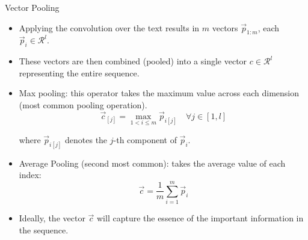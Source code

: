 \documentclass[handout]{beamer}
\begin{document}
\begin{frame}{Vector Pooling}
\begin{scriptsize}
\begin{itemize}
\item Applying the convolution over the text results in $m$ vectors $\vec{p}_{1:m}$, each $\vec{p}_i \in \mathcal{R}^l$.
\item These vectors are then combined (pooled) into a single vector $c \in \mathcal{R}^l$ representing the entire sequence.
\item Max pooling: this operator takes the maximum value across each dimension (most common pooling operation).
\begin{displaymath}
\vec{c}_{[j]}= \max_{1< i \leq m} \vec{p}_{i[j]} \quad \forall j \in [1,l]
\end{displaymath}

where $\vec{p}_{i[j]}$ denotes the $j$-th component of $\vec{p}_{i}$. 

\item Average Pooling (second most common): takes the average value of each index:
\begin{displaymath}
\vec{c} = \frac{1}{m} \sum_{i=1}^{m}\vec{p}_i
\end{displaymath}


\item Ideally, the vector $\vec{c}$ will capture the essence of the important information in the sequence. 

\end{itemize}
\end{scriptsize}
\end{frame}
\end{document}
